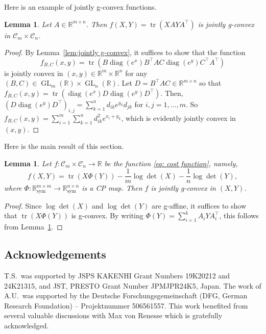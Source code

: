 \documentclass[a4paper]{article}
\newcommand{\R}{\mathbb{R}}
\newcommand{\caC}{\mathcal{C}}
\DeclareMathOperator{\tr}{tr}
\DeclareMathOperator{\diag}{diag}
\DeclareMathOperator{\GL}{GL}
\newtheorem{lemma}[theorem]{Lemma}
\theoremstyle{definition}
\numberwithin{equation}{section}
\begin{document}
Here is an example of jointly g-convex functions.

\begin{lemma}\label{lem:g-convex-XAYA}
Let $A \in \R^{m \times n}$. Then $f(X, Y) = \tr(XAYA^\top)$ is jointly g-convex in $\caC_m \times \caC_n$.
\end{lemma}

\begin{proof}
By Lemma~\ref{lem:jointly g-convex}, it suffices to show that the function
\[ 
 f_{B,C}(x,y) = \tr(B\diag(e^x)B^\top A C\diag(e^y) C^\top A^\top) 
\]
is jointly convex in $(x,y) \in \R^m \times \R^n$ for any $(B, C) \in \GL_m(\R) \times \GL_n(\R)$. Let $D = B^\top A C \in \R^{m \times n}$ so that $f_{B,C}(x,y) = \tr(\diag(e^x) D \diag(e^y) D^\top)$. Then, $(D \diag(e^y) D^\top)_{i,j} = \sum_{k=1}^n d_{ik}e^{y_k}d_{jk}$ for $i, j = 1, \dots, m$. So $f_{B,C}(x,y) = \sum_{i=1}^m \sum_{k=1}^n d_{ik}^2 e^{x_i + y_k}$, which is evidently jointly convex in $(x,y)$.
\end{proof}

Here is the main result of this section.

\begin{lemma}\label{lem:g-convex-f}
Let $f: \caC_m \times \caC_n \to \R$ be the function \eqref{eq: cost function}, namely, 
\[ 
 f(X,Y) = \tr(X\Phi(Y)) - \frac{1}{m}\log\det(X) - \frac{1}{n}\log\det(Y),
\]
where $\Phi: \R^{m \times m}_{\mathrm{sym}} \to \R^{n \times n}_{\mathrm{sym}}$ is a CP map. Then $f$ is jointly g-convex in $(X,Y)$.
\end{lemma}

\begin{proof}
Since $\log\det(X)$ and $\log\det(Y)$ are g-affine, it suffices to show that $\tr(X \Phi(Y))$ is g-convex. By writing $\Phi(Y) = \sum_{i=1}^k A_i^{} Y A_i^\top$, this follows from Lemma~\ref{lem:g-convex-XAYA}.
\end{proof}

\subsection*{Acknowledgements}
T.S.~was supported by JSPS KAKENHI Grant Numbers 19K20212 and 24K21315, and JST, PRESTO Grant Number JPMJPR24K5, Japan. The work of A.U.~was supported by the Deutsche Forschungs\-gemeinschaft (DFG, German Research Foundation) – Projektnummer 506561557. This work benefited from several valuable discussions with Max von Renesse which is gratefully acknowledged.

\small


\end{document}
